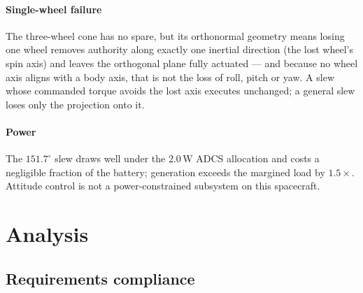 \documentclass[conference,10pt,a4paper]{IEEEtran}
\newcommand{\unit}[1]{\ensuremath{\,\mathrm{#1}}}
\begin{document}
\paragraph{Single-wheel failure}
\label{sec:failure}
The three-wheel cone has no spare, but its orthonormal geometry means losing
one wheel removes authority along exactly one inertial direction (the lost
wheel's spin axis) and leaves the orthogonal plane fully actuated --- and
because no wheel axis aligns with a body axis, that is not the loss of roll,
pitch or yaw. A slew whose commanded torque avoids the lost axis executes
unchanged; a general slew loses only the projection onto it.

\paragraph{Power}
The $151.7^\circ$ slew draws well under the $2.0\unit{W}$ ADCS allocation and
costs a negligible fraction of the battery; generation exceeds the margined
load by $1.5\times$. Attitude control is not a power-constrained subsystem on
this spacecraft.

\section{Analysis}
\label{sec:analysis}

\subsection{Requirements compliance}
\label{sec:compliance}
\end{document}
